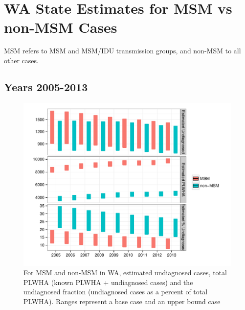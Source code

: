 \documentclass{article}\usepackage[]{graphicx}\usepackage[]{color}
\makeatletter
\def\maxwidth{ %
  \ifdim\Gin@nat@width>\linewidth
    \linewidth
  \else
    \Gin@nat@width
  \fi
}
\newenvironment{knitrout}{}{} %
\makeatother
\begin{document}
\pagebreak
\section{WA State Estimates for MSM vs non-MSM Cases}
MSM refers to MSM and MSM/IDU transmission groups, and non-MSM to all other cases. 

\subsection{Years 2005-2013}
\begin{knitrout}\footnotesize
{}\color{fgcolor}\begin{figure}[h]


{\centering \includegraphics[width=\maxwidth]{figure/minimal-WA-MSM} 

}

\caption[For MSM and non-MSM in WA, estimated undiagnosed cases, total PLWHA (known PLWHA + undiagnosed cases) and the undiagnosed fraction (undiagnosed cases as a percent of total PLWHA)]{For MSM and non-MSM in WA, estimated undiagnosed cases, total PLWHA (known PLWHA + undiagnosed cases) and the undiagnosed fraction (undiagnosed cases as a percent of total PLWHA). Ranges represent a base case and an upper bound case\label{fig:WA-MSM}}
\end{figure}


\end{knitrout}


\pagebreak
\end{document}
